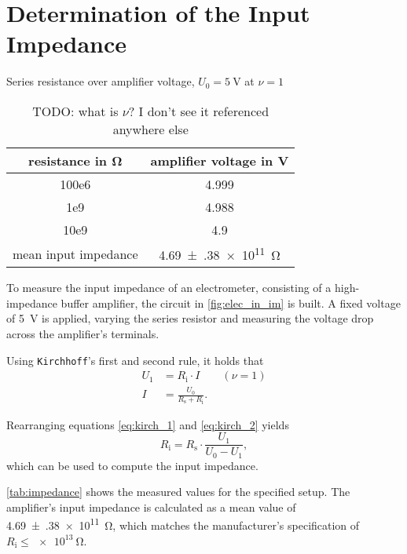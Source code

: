 \section{Determination of the Input Impedance}
\begin{table}[b!]
	\centering
	\caption[Series resistance over amplifier voltage]{Series resistance over amplifier voltage, $U_0=\SI{5}{\volt}$ at $\nu=1$}
	\caption*{TODO: what is $\nu$? I don't see it referenced anywhere else}
	\label{tab:impedance}
	\begin{tabular}{SS}
		\toprule
		{resistance in \si{\ohm}}	&	{amplifier voltage in \si{\volt}}	\\
		\midrule
			100e6	&	4.999	\\
			1e9	&	4.988	\\
			10e9	&	4.9	\\
		\midrule
		{mean input impedance}	&	\SI{4.69(38)e11}{\ohm}\\
		\bottomrule
	\end{tabular}
\end{table}
To measure the input impedance of an electrometer, consisting of a high-impedance buffer amplifier, the circuit in \autoref{fig:elec_in_im} is built.
A fixed voltage of \SI{5}{\volt} is applied, varying the series resistor and measuring the voltage drop across the amplifier's terminals.

Using \texttt{Kirchhoff}'s first and second rule, it holds that
\begin{align}
	U_1	&= 	R_\text{i}\cdot I \label{eq:kirch_1}\qquad(\nu = 1)\\
	I 					&=	\frac{U_0}{R_\text{s}+R_\text{i}}.	\label{eq:kirch_2}
\end{align}

Rearranging equations \ref{eq:kirch_1} and \ref{eq:kirch_2} yields
\begin{equation}
	R_\text{i}=R_\text{s}\cdot\frac{U_1}{U_0-U_1},
\end{equation}
which can be used to compute the input impedance.

\autoref{tab:impedance} shows the measured values for the specified setup.
The amplifier's input impedance is calculated as a mean value of \SI{4.69(38)e11}{\ohm}, which matches the manufacturer's specification of $R_\text{i}\leq\SI{e13}{\ohm}$.

